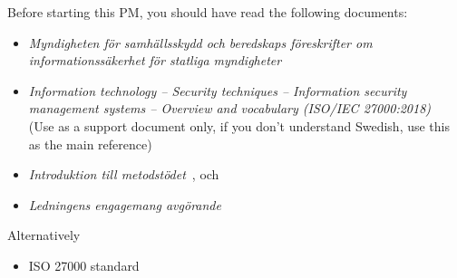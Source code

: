 
Before starting this PM, you should have read the following documents:

\begin{itemize}
  \item \emph{Myndigheten för samhällsskydd och beredskaps föreskrifter om informationssäkerhet för
      statliga myndigheter}~\cite{MSBFS2020:6}
  \item \emph{Information technology – Security techniques – Information
security management systems – Overview and vocabulary (ISO/IEC 27000:2018)}~\cite[chap. 4]{iso27000}
(Use as a support document only, if you don't understand Swedish, use this as the main reference)
  \item \emph{Introduktion till metodstödet}~\cite{MSB2018iom}, och
  \item \emph{Ledningens engagemang avgörande}~\cite{MSB2018sle}
\end{itemize}

Alternatively
\begin{itemize}
  \item ISO 27000 standard~\cite[Chapter 4]{iso27000}
\end{itemize}
